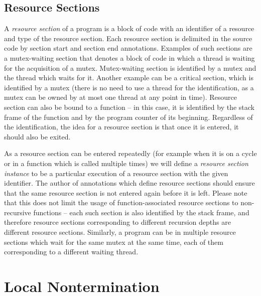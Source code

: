 
\subsection{Resource Sections}

A \emph{resource section} of a program is a block of code with an identifier of a resource and type of the resource section.
Each resource section is delimited in the source code by section start and section end annotations.
Examples of such sections are a mutex-waiting section that denotes a block of code in which a thread is waiting for the acquisition of a mutex.
Mutex-waiting section is identified by a mutex and the thread which waits for it.
Another example can be a critical section, which is identified by a mutex (there is no need to use a thread for the identification, as a mutex can be owned by at most one thread at any point in time).
Resource section can also be bound to a function -- in this case, it is identified by the stack frame of the function and by the program counter of its beginning.
Regardless of the identification, the idea for a resource section is that once it is entered, it should also be exited.

As a resource section can be entered repeatedly (for example when it is on a cycle or in a function which is called multiple times) we will define a \emph{resource section instance} to be a particular execution of a resource section with the given identifier.
The author of annotations which define resource sections should ensure that the same resource section is not entered again before it is left.
Please note that this does not limit the usage of function-associated resource sections to non-recursive functions -- each such section is also identified by the stack frame, and therefore resource sections corresponding to different recursion depths are different resource sections.
Similarly, a program can be in multiple resource sections which wait for the same mutex at the same time, each of them corresponding to a different waiting thread.

\section{Local Nontermination} \label{sec:local-nontermination}

